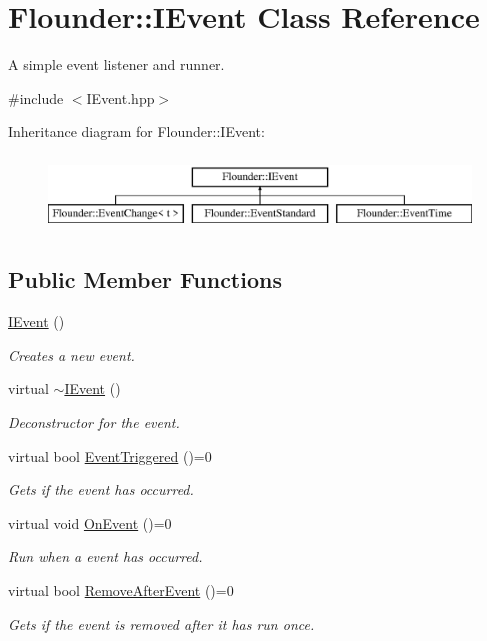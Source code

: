 \hypertarget{class_flounder_1_1_i_event}{}\section{Flounder\+:\+:I\+Event Class Reference}
\label{class_flounder_1_1_i_event}


A simple event listener and runner.  




{\ttfamily \#include $<$I\+Event.\+hpp$>$}

Inheritance diagram for Flounder\+:\+:I\+Event\+:\begin{figure}[H]
\begin{center}
\leavevmode
\includegraphics[height=2.000000cm]{class_flounder_1_1_i_event}
\end{center}
\end{figure}
\subsection*{Public Member Functions}
\begin{DoxyCompactItemize}
\item 
\hyperlink{class_flounder_1_1_i_event_a51f15ac8bde2966b1976eb3dd76e53a8}{I\+Event} ()
\begin{DoxyCompactList}\small\item\em Creates a new event. \end{DoxyCompactList}\item 
virtual \hyperlink{class_flounder_1_1_i_event_a9fa069674872c969f3e921dd0c3d864b}{$\sim$\+I\+Event} ()
\begin{DoxyCompactList}\small\item\em Deconstructor for the event. \end{DoxyCompactList}\item 
virtual bool \hyperlink{class_flounder_1_1_i_event_a86004d7cbef85aa2f80e6def5dc107b3}{Event\+Triggered} ()=0
\begin{DoxyCompactList}\small\item\em Gets if the event has occurred. \end{DoxyCompactList}\item 
virtual void \hyperlink{class_flounder_1_1_i_event_a67f7265c6decfdf4d29b94a088f45501}{On\+Event} ()=0
\begin{DoxyCompactList}\small\item\em Run when a event has occurred. \end{DoxyCompactList}\item 
virtual bool \hyperlink{class_flounder_1_1_i_event_a69893f543c31d93243833a4df1afa041}{Remove\+After\+Event} ()=0
\begin{DoxyCompactList}\small\item\em Gets if the event is removed after it has run once. \end{DoxyCompactList}\end{DoxyCompactItemize}


